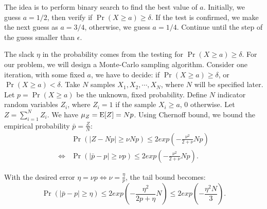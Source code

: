 The idea is to perform binary search to find the best value of $a$. Initially, we guess $a = 1/2$,
then verify if $\Pr(X \geq a) \geq \delta$. If the test is confirmed, we make the next guess as
$a = 3/4$, otherwise, we guess $a = 1/4$. Continue until the step of the guess smaller than
$\epsilon$.

The slack $\eta$ in the probability comes from the testing for $\Pr(X \geq a) \geq \delta$. For our
problem,  we will design a Monte-Carlo sampling algorithm. Consider one iteration, with some fixed $a$,  we have to decide: if $\Pr(X \geq a) \geq
\delta$, or $\Pr(X \geq a) < \delta$.
Take $N$ samples $X_1,X_2,\cdots,X_N$, where $N$ will be specified later. Let
$p = \Pr(X \geq a)$ be the unknown, fixed probability. Define $N$ indicator random variables $Z_i$,
where $Z_i = 1$ if the sample $X_i \geq a$, $0$ otherwise. Let $Z = \sum_{i=1}^{N}Z_i$. We have
$\mu_Z=\operatorname{E}[Z] = Np$. Using Chernoff bound\cite{Upfal-book}, we bound the empirical probability $\bar p
= \frac{Z}{N}$:
\begin{align*}
  & \Pr(|Z - Np| \geq \nu Np) \leq 2 exp \left( - \frac{\nu^2}{2+\nu} Np \right) \\
  \iff &\Pr \left( |\bar p - p| \geq \nu p \right) \leq
    2 exp \left( - \frac{\nu^2}{2+\nu} Np \right).
\end{align*}

With the desired  error $\eta = \nu p \iff \nu = \frac{\eta}{p}$, the tail bound becomes:
\begin{equation}
  \Pr \left( |\bar p - p| \geq \eta \right) \leq
    2 exp \left( - \frac{\eta^2}{2p + \eta} N \right)
  \leq 2 exp \left( - \frac{\eta^2 N}{3} \right).
\end{equation}

